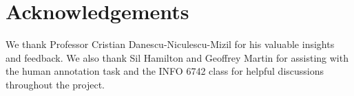 \section*{Acknowledgements}
We thank Professor Cristian Danescu-Niculescu-Mizil for his valuable insights 
and feedback. We also thank Sil Hamilton and Geoffrey Martin for 
assisting with the human annotation task and the INFO 6742 
class for helpful discussions throughout the project.
